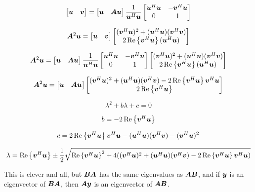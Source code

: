 \documentclass{article}
\begin{document}
\begin{equation}
\begin{bmatrix}
\bm{u} & \bm{v}
\end{bmatrix} =
\begin{bmatrix}
\bm{u} & \bm{A}\bm{u}
\end{bmatrix}
\frac{1}{\bm{u}^H\bm{u}}
\begin{bmatrix}
\bm{u}^H\bm{u} & -\bm{v}^H\bm{u}\\
0 & 1
\end{bmatrix}
\end{equation}

\begin{equation}
\bm{A}^2\bm{u} = \begin{bmatrix} \bm{u} & \bm{v} \end{bmatrix} \begin{bmatrix} (\bm{v}^H\bm{u})^2 + (\bm{u}^H\bm{u})(\bm{v}^H\bm{v}) \\ 2\operatorname{Re}\left\{\bm{v}^H\bm{u}\right\}(\bm{u}^H\bm{u}) \end{bmatrix}
\end{equation}

\begin{equation}
\bm{A}^2\bm{u} = \begin{bmatrix}
\bm{u} & \bm{A}\bm{u}
\end{bmatrix}
\frac{1}{\bm{u}^H\bm{u}}
\begin{bmatrix}
\bm{u}^H\bm{u} & -\bm{v}^H\bm{u}\\
0 & 1
\end{bmatrix}
\begin{bmatrix} (\bm{v}^H\bm{u})^2 + (\bm{u}^H\bm{u})(\bm{v}^H\bm{v}) \\ 2\operatorname{Re}\left\{\bm{v}^H\bm{u}\right\}(\bm{u}^H\bm{u}) \end{bmatrix}
\end{equation}

\begin{equation}
\bm{A}^2\bm{u} = \begin{bmatrix}
\bm{u} & \bm{A}\bm{u}
\end{bmatrix}
\begin{bmatrix} (\bm{v}^H\bm{u})^2 + (\bm{u}^H\bm{u})(\bm{v}^H\bm{v}) - 2\operatorname{Re}\left\{\bm{v}^H\bm{u}\right\}\bm{v}^H\bm{u} \\ 2\operatorname{Re}\left\{\bm{v}^H\bm{u}\right\} \end{bmatrix}
\end{equation}

\begin{equation}
\lambda^2 + b\lambda + c = 0
\end{equation}

\begin{equation}
b = -2\operatorname{Re}\left\{\bm{v}^H\bm{u}\right\}
\end{equation}

\begin{equation}
c = 2\operatorname{Re}\left\{\bm{v}^H\bm{u}\right\}\bm{v}^H\bm{u} - (\bm{u}^H\bm{u})(\bm{v}^H\bm{v}) - (\bm{v}^H\bm{u})^2
\end{equation}

\begin{equation}
\lambda = \operatorname{Re}\left\{\bm{v}^H\bm{u}\right\} \pm \frac{1}{2}\sqrt{\operatorname{Re}\left\{\bm{v}^H\bm{u}\right\}^2 + 4( (\bm{v}^H\bm{u})^2 + (\bm{u}^H\bm{u})(\bm{v}^H\bm{v}) - 2\operatorname{Re}\left\{\bm{v}^H\bm{u}\right\}\bm{v}^H\bm{u})}
\end{equation}

This is clever and all, but $\bm{B}\bm{A}$ has the same eigenvalues as $\bm{A}\bm{B}$, and if $\bm{y}$ is an eigenvector of $\bm{B}\bm{A}$, then $\bm{A}\bm{y}$ is an eigenvector of $\bm{A}\bm{B}$.
\end{document}
